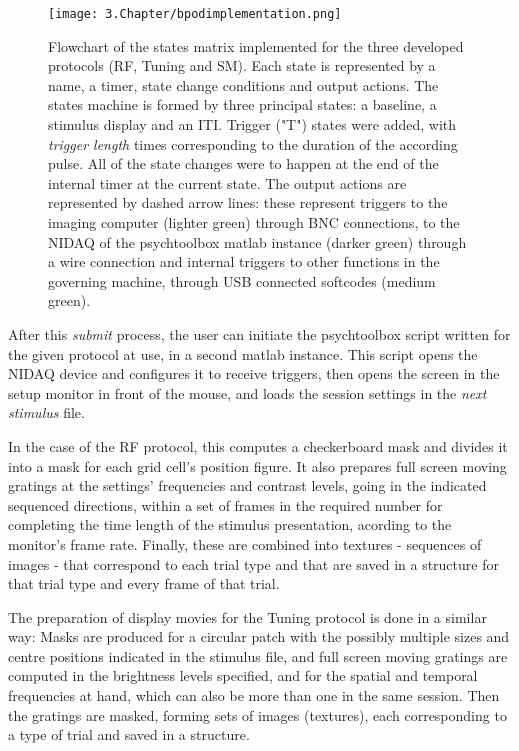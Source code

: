 \begin{figure}[H]
	\centering
		\texttt{[image: 3.Chapter/bpodimplementation.png]}
	\caption[c1]{Flowchart of the states matrix implemented for the three developed protocols (RF, Tuning and SM). Each state is represented by a name, a timer, state change conditions and output actions. The states machine is formed by three principal states: a baseline, a stimulus display and an ITI. Trigger ("T") states were added, with \textit{trigger length} times corresponding to the duration of the according pulse. All of the state changes were to happen at the end of the internal timer at the current state. The output actions are represented by dashed arrow lines: these represent triggers to the imaging computer (lighter green) through BNC connections, to the NIDAQ of the psychtoolbox matlab instance (darker green) through a wire connection and internal triggers to other functions in the governing machine, through USB connected softcodes (medium green).}
	\label{fig:bpodimplementation}
\end{figure}

After this \textit{submit} process, the user can initiate the psychtoolbox script written for the given protocol at use, in a second matlab instance. This script opens the NIDAQ device and configures it to receive triggers, then opens the screen in the setup monitor in front of the mouse, and loads the session settings in the \textit{next stimulus} file. 

In the case of the RF protocol, this computes a checkerboard mask and divides it into a mask for each grid cell's position figure. It also prepares full screen moving gratings at the settings' frequencies and contrast levels, going in the indicated sequenced directions, within a set of frames in the required number for completing the time length of the stimulus presentation, acording to the monitor's frame rate. Finally, these are combined into textures - sequences of images - that correspond to each trial type and that are saved in a structure for that trial type and every frame of that trial.

The preparation of display movies for the Tuning protocol is done in a similar way: Masks are produced for a circular patch with the possibly multiple sizes and centre positions indicated in the stimulus file, and full screen moving gratings are computed in the brightness levels specified, and for the spatial and temporal frequencies at hand, which can also be more than one in the same session. Then the gratings are masked, forming sets of images (textures), each corresponding to a type of trial and saved in a structure.

